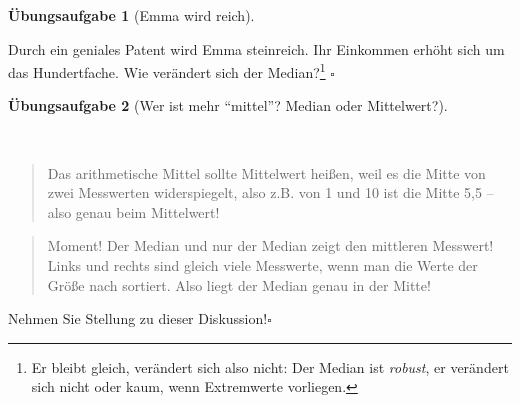 \documentclass[
  letterpaper,
]{scrbook}
\theoremstyle{definition}
\theoremstyle{definition}
\theoremstyle{definition}
\newtheorem{exercise}{Übungsaufgabe}[chapter]
\theoremstyle{remark}
\begin{document}
\begin{exercise}[Emma wird
reich]\protect\hypertarget{exr-md2}{}\label{exr-md2}

Durch ein geniales Patent wird Emma steinreich. Ihr Einkommen erhöht
sich um das Hundertfache. Wie verändert sich der Median?\footnote{Er
  bleibt gleich, verändert sich also nicht: Der Median ist
  \emph{robust}, er verändert sich nicht oder kaum, wenn Extremwerte
  vorliegen.} \(\square\)

\end{exercise}

\begin{exercise}[Wer ist mehr ``mittel''? Median oder
Mittelwert?]\protect\hypertarget{exr-mw-md}{}\label{exr-mw-md}

~

\begin{quote}
{} Das arithmetische Mittel sollte Mittelwert heißen,
weil es die Mitte von zwei Messwerten widerspiegelt, also z.B. von 1 und
10 ist die Mitte 5,5 -- also genau beim Mittelwert!
\end{quote}

\begin{quote}
{} Moment! Der Median und nur der Median zeigt den
mittleren Messwert! Links und rechts sind gleich viele Messwerte, wenn
man die Werte der Größe nach sortiert. Also liegt der Median genau in
der Mitte!
\end{quote}

Nehmen Sie Stellung zu dieser Diskussion!\(\square\)

\end{exercise}
\end{document}
